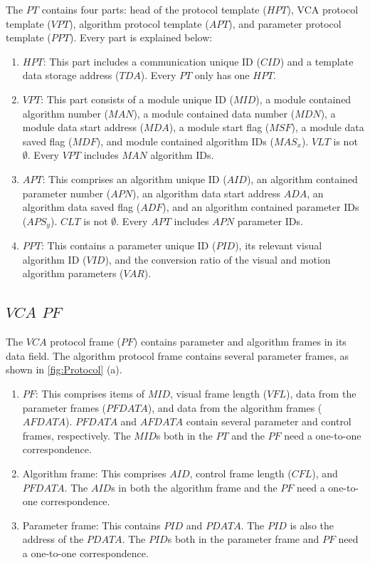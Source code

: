 \documentclass[journal,UTF8]{IEEEtran}
\begin{document}
	
	The $PT$ contains four parts: head of the protocol template ($HPT$), VCA protocol template ($VPT$), algorithm protocol template ($APT$), and parameter protocol template ($PPT$). Every part is explained below:
	\begin{enumerate}
		\item $HPT$: This part includes a communication unique ID ($CID$) and a template data storage address ($TDA$). Every $PT$ only has one $HPT$.
		\item $VPT$: This part consists of a module unique ID ($MID$), a module contained algorithm number ($MAN$), a module contained data number ($MDN$), a module data start address ($MDA$), a module start flag ($MSF$), a module data saved flag ($MDF$), and module contained algorithm IDs ($MAS_x$). $VLT$ is not $\emptyset$. Every $VPT$ includes $MAN$ algorithm IDs. 
		\item $APT$: This comprises an algorithm unique ID ($AID$), an algorithm contained parameter number ($APN$), an algorithm data start address $ADA$, an algorithm data saved flag ($ADF$), and an algorithm contained parameter IDs ($APS_y$). $CLT$ is not $\emptyset$. Every $APT$ includes $APN$ parameter IDs.
		\item $PPT$: This contains a parameter unique ID ($PID$), its relevant visual algorithm ID ($VID$), and the conversion ratio of the visual and motion algorithm parameters ($VAR$).  
	\end{enumerate}
	\subsection{$VCA$ $PF$}
	The $VCA$ protocol frame ($PF$) contains parameter and algorithm frames in its data field. The algorithm protocol frame contains several parameter frames, as shown in \ref{fig:Protocol} (a). 
	
	\begin{enumerate}
		\item $PF$: This comprises items of $MID$, visual frame length ($VFL$), data from the parameter frames ($PFDATA$), and data from the algorithm frames ($AFDATA$). $PFDATA$ and $AFDATA$ contain several parameter and control frames, respectively. The $MID$s both in the $PT$ and the $PF$ need a one-to-one correspondence.
		\item Algorithm frame: This comprises $AID$, control frame length ($CFL$), and $PFDATA$. The $AID$s in both the algorithm frame and the $PF$ need a one-to-one correspondence.
		\item Parameter frame: This contains $PID$ and $PDATA$. The $PID$ is also the address of the $PDATA$. The $PID$s both in the parameter frame and $PF$ need a one-to-one correspondence.
	\end{enumerate}
	
\end{document}
